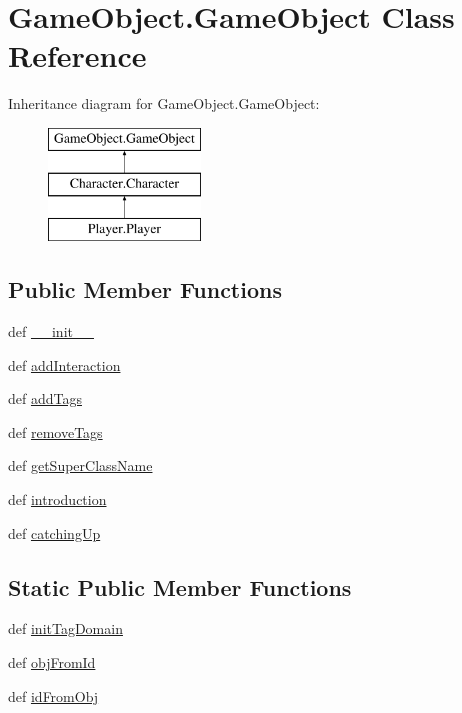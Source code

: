 \hypertarget{classGameObject_1_1GameObject}{\section{\-Game\-Object.\-Game\-Object \-Class \-Reference}
\label{classGameObject_1_1GameObject}
}
\-Inheritance diagram for \-Game\-Object.\-Game\-Object\-:\begin{figure}[H]
\begin{center}
\leavevmode
\includegraphics[height=3.000000cm]{classGameObject_1_1GameObject}
\end{center}
\end{figure}
\subsection*{\-Public \-Member \-Functions}
\begin{DoxyCompactItemize}
\item 
def \hyperlink{classGameObject_1_1GameObject_a388f494ea5093578fa2a386b20eb9f4a}{\-\_\-\-\_\-init\-\_\-\-\_\-}
\item 
def \hyperlink{classGameObject_1_1GameObject_a7cb3c8e68eea9ec7a18aa5f12c49299f}{add\-Interaction}
\item 
def \hyperlink{classGameObject_1_1GameObject_a12165afe9211fd3a2d0e52cf5a364bec}{add\-Tags}
\item 
def \hyperlink{classGameObject_1_1GameObject_aca961c48562553b68319583a74fb3327}{remove\-Tags}
\item 
def \hyperlink{classGameObject_1_1GameObject_af03461727168ab632690aaf710c0f2bd}{get\-Super\-Class\-Name}
\item 
def \hyperlink{classGameObject_1_1GameObject_a10826507bf158f9678071a3eddcee0e9}{introduction}
\item 
def \hyperlink{classGameObject_1_1GameObject_a86432a4b5f554dc490504b7ca01e2cb9}{catching\-Up}
\end{DoxyCompactItemize}
\subsection*{\-Static \-Public \-Member \-Functions}
\begin{DoxyCompactItemize}
\item 
def \hyperlink{classGameObject_1_1GameObject_abea66e6f349308e235a6f044a1276f4b}{init\-Tag\-Domain}
\item 
def \hyperlink{classGameObject_1_1GameObject_aa37db10065043a169cccbe7d3a3fda92}{obj\-From\-Id}
\item 
def \hyperlink{classGameObject_1_1GameObject_a114c8b7fd3c2f7450b07b796fc982ea6}{id\-From\-Obj}
\end{DoxyCompactItemize}

